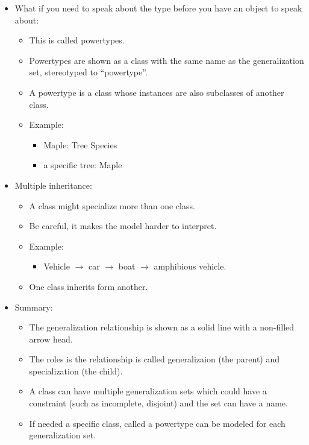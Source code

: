 \begin{itemize}
    \item What if you need to speak about the type before you have an object to speak about:
        \begin{itemize}
            \item This is called powertypes.
            \item Powertypes are shown as a class with the same name as the generalization set, stereotyped to ``powertype''.
            \item A powertype is a class whose instances are also subclasses of another class. 
            \item Example:
                \begin{itemize}
                    \item Maple: Tree Species 
                    \item a specific tree: Maple 
                \end{itemize}
        \end{itemize}
    
    \item Multiple inheritance:
        \begin{itemize}
            \item A class might specialize more than one class.
            \item Be careful, it makes the model harder to interpret.
            \item Example: 
                \begin{itemize}
                    \item Vehicle $\rightarrow$ car $\rightarrow$ boat $\rightarrow$ amphibious vehicle.
                \end{itemize}
            
            \item One class inherits form another. 
        \end{itemize}
    
    \item Summary:
        \begin{itemize}
            \item The generalization relationship is shown as a solid line with a non-filled arrow head.
            \item The roles is the relationship is called generalizaion (the parent) and specialization (the child).
            \item A class can have multiple generalization sets which could have a constraint (such as incomplete, disjoint) and the set can have a name.
            \item If needed a specific class, called a powertype can be modeled for each generalization set. 
        \end{itemize}
\end{itemize}


